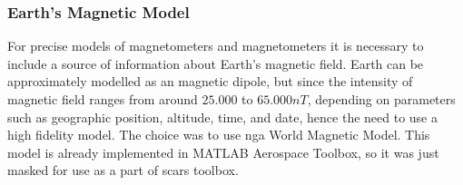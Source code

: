     \subsubsection{Earth's Magnetic Model}
        For precise models of magnetometers and magnetometers it is necessary to include a source of information about Earth's magnetic field. Earth can be approximately modelled as an magnetic dipole, but since the intensity of magnetic field ranges from around $25.000$ to $65.000 nT$, depending on parameters such as geographic position, altitude, time, and date, hence the need to use a high fidelity model. The choice was to use \ac{nga} World Magnetic Model. This model is already implemented in MATLAB Aerospace Toolbox, so it was just masked for use as a part of \ac{scars} toolbox.
 
